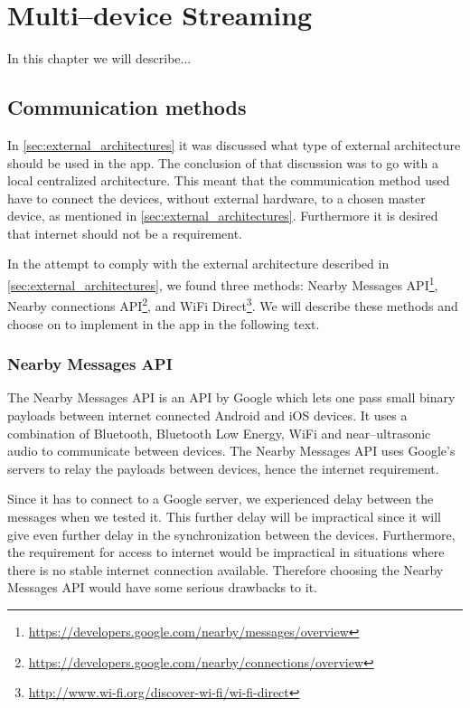 \chapter{Multi--device Streaming}
In this chapter we will describe...

\section{Communication methods}
In \cref{sec:external_architectures} it was discussed what type of external architecture should be used in the app.
The conclusion of that discussion was to go with a local centralized architecture.
This meant that the communication method used have to connect the devices, without external hardware, to a chosen master device, as mentioned in \cref{sec:external_architectures}.
Furthermore it is desired that internet should not be a requirement.

In the attempt to comply with the external architecture described in \cref{sec:external_architectures}, we found three methods: Nearby Messages API\footnote{\url{https://developers.google.com/nearby/messages/overview}}, Nearby connections API\footnote{\url{https://developers.google.com/nearby/connections/overview}}, and WiFi Direct\footnote{\url{http://www.wi-fi.org/discover-wi-fi/wi-fi-direct}}.
We will describe these methods and choose on to implement in the app in the following text.

\subsection{Nearby Messages API}
The Nearby Messages API is an API by Google which lets one pass small binary payloads between internet connected Android and iOS devices. 
It uses a combination of Bluetooth, Bluetooth Low Energy, WiFi and near--ultrasonic audio to communicate between devices.
The Nearby Messages API uses Google's servers to relay the payloads between devices, hence the internet requirement.\cite{nearby_messages}

Since it has to connect to a Google server, we experienced delay between the messages when we tested it.
This further delay will be impractical since it will give even further delay in the synchronization between the devices.
Furthermore, the requirement for access to internet would be impractical in situations where there is no stable internet connection available.
Therefore choosing the Nearby Messages API would have some serious drawbacks to it. 

